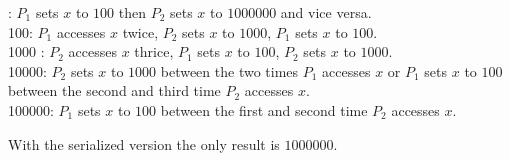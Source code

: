 \documentclass[a4paper,12pt]{article}
\begin{document}
: $P_1$ sets $x$ to $100$ then $P_2$ sets $x$ to $1000000$ and
vice versa.\\
100: $P_1$ accesses $x$ twice, $P_2$ sets $x$ to $1000$, $P_1$ sets
$x$ to $100$.\\
1000 : $P_2$ accesses $x$ thrice, $P_1$ sets $x$ to $100$, $P_2$ sets $x$
to $1000$.\\
10000: $P_2$ sets $x$ to $1000$ between the two times $P_1$ accesses
$x$ or $P_1$ sets $x$ to $100$ between the second and third time $P_2$
accesses $x$. \\
100000: $P_1$ sets $x$ to $100$ between the first and second time  $P_2$
accesses $x$.

With the serialized version the only result is $1000000$.
\end{document}

